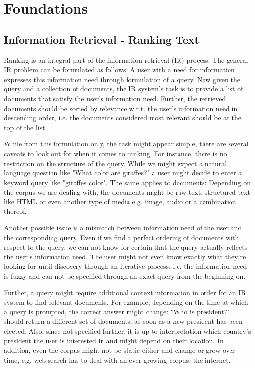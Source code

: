 \chapter{Foundations}
\label{foundations}
\section{Information Retrieval - Ranking Text}
\label{sec:ir}
Ranking is an integral part of the information retrieval (IR) process. The general IR problem can be formulated as follows: A user with a need for information expresses this information need through formulation of a query. Now given the query and a collection of documents, the IR system's task is to provide a list of documents that satisfy the user's information need. Further, the retrieved documents should be sorted by relevance w.r.t. the user's information need in descending order, i.e. the documents considered most relevant should be at the top of the list.

While from this formulation only, the task might appear simple, there are several caveats to look out for when it comes to ranking. For instance, there is no restriction on the structure of the query. While we might expect a natural language question like "What color are giraffes?" a user might decide to enter a keyword query like "giraffes color". The same applies to documents: Depending on the corpus we are dealing with, the documents might be raw text, structured text like HTML or even another type of media e.g. image, audio or a combination thereof.

Another possible issue is a mismatch between information need of the user and the corresponding query. Even if we find a perfect ordering of documents with respect to the query, we can not know for certain that the query actually reflects the user's information need. The user might not even know exactly what they're looking for until discovery through an iterative process, i.e. the information need is fuzzy and can not be specified through an exact query from the beginning on.

Further, a query might require additional context information in order for an IR system to find relevant documents. For example, depending on the time at which a query is prompted, the correct answer might change: "Who is president?" should return a different set of documents, as soon as a new president has been elected. Also, since not specified further, it is up to interpretation which country's president the user is interested in and might depend on their location.
In addition, even the corpus might not be static either and change or grow over time, e.g. web search has to deal with an ever-growing corpus: the internet.

